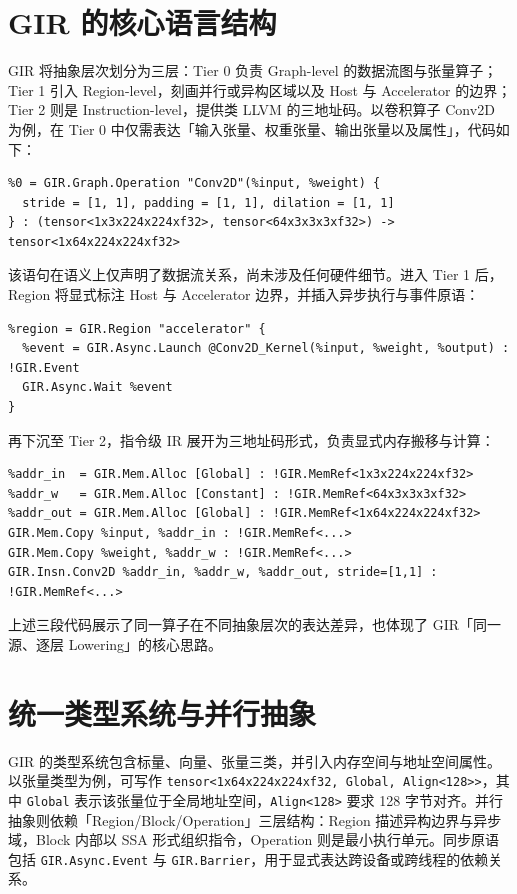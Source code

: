 \chapter{GIR 的核心语言结构}
GIR 将抽象层次划分为三层：Tier 0 负责 Graph-level 的数据流图与张量算子；Tier 1 引入 Region-level，刻画并行或异构区域以及 Host 与 Accelerator 的边界；Tier 2 则是 Instruction-level，提供类 LLVM 的三地址码。以卷积算子 Conv2D 为例，在 Tier 0 中仅需表达「输入张量、权重张量、输出张量以及属性」，代码如下：\par
\begin{lstlisting}
%0 = GIR.Graph.Operation "Conv2D"(%input, %weight) {
  stride = [1, 1], padding = [1, 1], dilation = [1, 1]
} : (tensor<1x3x224x224xf32>, tensor<64x3x3x3xf32>) -> tensor<1x64x224x224xf32>
\end{lstlisting}
该语句在语义上仅声明了数据流关系，尚未涉及任何硬件细节。进入 Tier 1 后，Region 将显式标注 Host 与 Accelerator 边界，并插入异步执行与事件原语：\par
\begin{lstlisting}
%region = GIR.Region "accelerator" {
  %event = GIR.Async.Launch @Conv2D_Kernel(%input, %weight, %output) : !GIR.Event
  GIR.Async.Wait %event
}
\end{lstlisting}
再下沉至 Tier 2，指令级 IR 展开为三地址码形式，负责显式内存搬移与计算：\par
\begin{lstlisting}
%addr_in  = GIR.Mem.Alloc [Global] : !GIR.MemRef<1x3x224x224xf32>
%addr_w   = GIR.Mem.Alloc [Constant] : !GIR.MemRef<64x3x3x3xf32>
%addr_out = GIR.Mem.Alloc [Global] : !GIR.MemRef<1x64x224x224xf32>
GIR.Mem.Copy %input, %addr_in : !GIR.MemRef<...>
GIR.Mem.Copy %weight, %addr_w : !GIR.MemRef<...>
GIR.Insn.Conv2D %addr_in, %addr_w, %addr_out, stride=[1,1] : !GIR.MemRef<...>
\end{lstlisting}
上述三段代码展示了同一算子在不同抽象层次的表达差异，也体现了 GIR「同一源、逐层 Lowering」的核心思路。\par
\chapter{统一类型系统与并行抽象}
GIR 的类型系统包含标量、向量、张量三类，并引入内存空间与地址空间属性。以张量类型为例，可写作 \texttt{tensor<1x64x224x224xf32, Global, Align<128>>}，其中 \texttt{Global} 表示该张量位于全局地址空间，\texttt{Align<128>} 要求 128 字节对齐。并行抽象则依赖「Region/Block/Operation」三层结构：Region 描述异构边界与异步域，Block 内部以 SSA 形式组织指令，Operation 则是最小执行单元。同步原语包括 \texttt{GIR.Async.Event} 与 \texttt{GIR.Barrier}，用于显式表达跨设备或跨线程的依赖关系。\par
